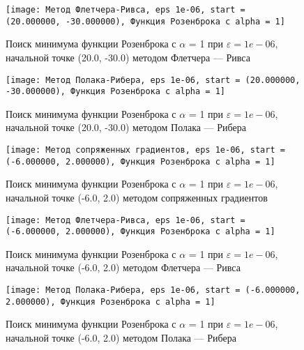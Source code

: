             \begin{figure}[H]
	        \centering
	        \texttt{[image: Метод Флетчера-Ривса, eps 1e-06, start = (20.000000, -30.000000), Функция Розенброка с alpha = 1]}%
	        \caption{Поиск минимума функции Розенброка с $\alpha$ = 1 при $\varepsilon = 1e-06$, начальной точке (20.0, -30.0) методом Флетчера --- Ривса}
	        \vspace*{-1.2cm}
            \end{figure}
            
            \begin{figure}[H]
	        \centering
	        \texttt{[image: Метод Полака-Рибера, eps 1e-06, start = (20.000000, -30.000000), Функция Розенброка с alpha = 1]}%
	        \caption{Поиск минимума функции Розенброка с $\alpha$ = 1 при $\varepsilon = 1e-06$, начальной точке (20.0, -30.0) методом Полака --- Рибера}
	        \vspace*{-1.2cm}
            \end{figure}
            
            \begin{figure}[H]
	        \centering
	        \texttt{[image: Метод сопряженных градиентов, eps 1e-06, start = (-6.000000, 2.000000), Функция Розенброка с alpha = 1]}%
	        \caption{Поиск минимума функции Розенброка с $\alpha$ = 1 при $\varepsilon = 1e-06$, начальной точке (-6.0, 2.0) методом сопряженных градиентов}
	        \vspace*{-1.2cm}
            \end{figure}
            
            \begin{figure}[H]
	        \centering
	        \texttt{[image: Метод Флетчера-Ривса, eps 1e-06, start = (-6.000000, 2.000000), Функция Розенброка с alpha = 1]}%
	        \caption{Поиск минимума функции Розенброка с $\alpha$ = 1 при $\varepsilon = 1e-06$, начальной точке (-6.0, 2.0) методом Флетчера --- Ривса}
	        \vspace*{-1.2cm}
            \end{figure}
            
            \begin{figure}[H]
	        \centering
	        \texttt{[image: Метод Полака-Рибера, eps 1e-06, start = (-6.000000, 2.000000), Функция Розенброка с alpha = 1]}%
	        \caption{Поиск минимума функции Розенброка с $\alpha$ = 1 при $\varepsilon = 1e-06$, начальной точке (-6.0, 2.0) методом Полака --- Рибера}
	        \vspace*{-1.2cm}
            \end{figure}
